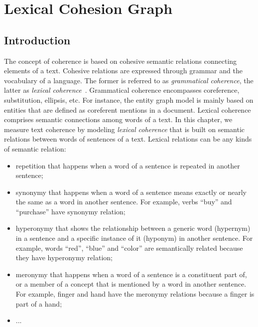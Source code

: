 \chapter{Lexical Cohesion Graph}
\label{chapt:lexical_coherence_graph}


\section{Introduction}
\label{sec:introduction}
The concept of coherence is based on cohesive semantic relations
connecting elements of a text. 
Cohesive relations are expressed through grammar and the vocabulary of a language. 
The former is referred to as \emph{grammatical coherence}, the latter as \emph{lexical coherence}\ \cite{halliday76}. 
Grammatical coherence encompasses coreference, substitution, ellipsis, etc. 
For instance, the entity graph model is mainly based on entities that are defined as coreferent mentions in a document.  
Lexical coherence comprises semantic connections among words of a text.
In this chapter, we measure text coherence by modeling \emph{lexical coherence} that is 
built on semantic relations between words of sentences of a text. 
Lexical relations can be any kinds of semantic relation: 

\begin{itemize}
\item repetition that happens when a word of a sentence is repeated in another sentence;

\item synonymy that happens when a word of a sentence means exactly or nearly the same as a word in another sentence. 
For example, verbs ``buy'' and ``purchase'' have synonymy relation;  

\item hyperonymy that shows the relationship between a generic word (hypernym) in a sentence and a specific instance of it (hyponym) in another sentence. 
For example, words ``red'', ``blue'' and ``color'' are semantically related because they have hyperonymy relation;

\item meronymy that happens when a word of a sentence is a constituent part of, or a member of a concept that is mentioned by a word in another sentence. 
For example, finger and hand have the meronymy relations because a finger is part of a hand;

\item ...
\end{itemize}

